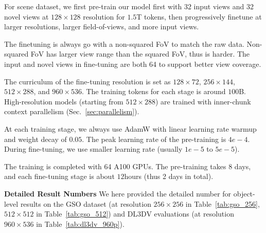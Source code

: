 \documentclass{article}
\begin{document}
For scene dataset, we first pre-train our model first with 32 input views and 32 novel views at $128\times128$ resolution for $1.5$T tokens, then progressively finetune at larger resolutions, larger field-of-views, and more input views.

The finetuning is always go with a non-squared FoV to match the raw data.
Non-squared FoV has larger view range than the squared FoV, thus is harder.
The input and novel views in fine-tuning are both 64 to support better view coverage.

The curriculum of the fine-tuning resolution is set as $128 \times 72$, $256 \times 144$, $512 \times 288$, and $960 \times 536$.
The training tokens for each stage is around $100$B.
High-resolution models (starting from $512 \times 288$) are trained with inner-chunk context parallelism (Sec.~\ref{sec:parallelism}). 

At each training stage, we always use AdamW with linear learning rate warmup and weight decay of $0.05$.
The peak learning rate of the pre-training is $4e-4$.
During fine-tuning, we use smaller learning rate (usually $1e-5$ to $5e-5$).

The training is completed with 64 A100 GPUs.
The pre-training takes $8$ days, and each fine-tuning stage is about $12$hours (thus 2 days in total).

\noindent\textbf{Detailed Result Numbers}
We here provided the detailed number for object-level  results on the GSO dataset (at resolution $256\times256$ in Table~\ref{tab:gso_256}, $512\times512$ in Table~\ref{tab:gso_512}) and DL3DV evaluations (at resolution $960\times536$ in Table~\ref{tab:dl3dv_960p}).
\end{document}
